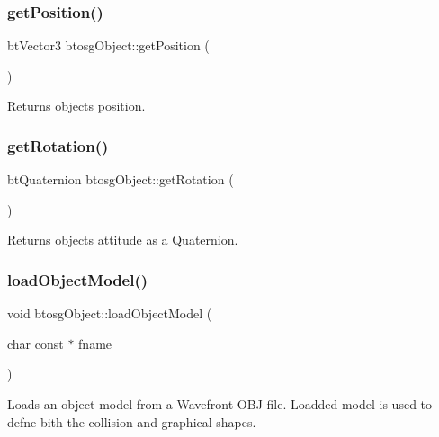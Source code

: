 \subsubsection{\texorpdfstring{get\+Position()}{getPosition()}}
{\footnotesize\ttfamily bt\+Vector3 btosg\+Object\+::get\+Position (\begin{DoxyParamCaption}{ }\end{DoxyParamCaption})\hspace{0.3cm}{\ttfamily [inline]}}

Returns object\textquotesingle{}s position. \mbox{\label{classbtosgObject_a9cadb03762699412552601196950a039}} 
\subsubsection{\texorpdfstring{get\+Rotation()}{getRotation()}}
{\footnotesize\ttfamily bt\+Quaternion btosg\+Object\+::get\+Rotation (\begin{DoxyParamCaption}{ }\end{DoxyParamCaption})\hspace{0.3cm}{\ttfamily [inline]}}

Returns object\textquotesingle{}s attitude as a Quaternion. \mbox{\label{classbtosgObject_a91838b8235579da178fcc06e6d3d47f3}} 
\subsubsection{\texorpdfstring{load\+Object\+Model()}{loadObjectModel()}}
{\footnotesize\ttfamily void btosg\+Object\+::load\+Object\+Model (\begin{DoxyParamCaption}\item[{char const $\ast$}]{fname }\end{DoxyParamCaption})}

Loads an object model from a Wavefront O\+BJ file. Loadded model is used to defne bith the collision and graphical shapes. \mbox{\label{classbtosgObject_acfd70fa6477c80fd7f29ad7ab9f4f067}} 
